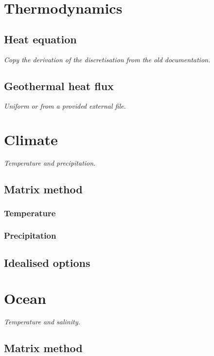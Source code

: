\documentclass{article}
\begin{document}
\newpage
\section{Thermodynamics}

\subsection{Heat equation}

\textit{Copy the derivation of the discretisation from the old documentation.}

\subsection{Geothermal heat flux}

\textit{Uniform or from a provided external file.}

\newpage
\section{Climate}

\textit{Temperature and precipitation.}

\subsection{Matrix method}

\subsubsection{Temperature}

\subsubsection{Precipitation}

\subsection{Idealised options}

\newpage
\section{Ocean}

\textit{Temperature and salinity.}

\subsection{Matrix method}
\end{document}
